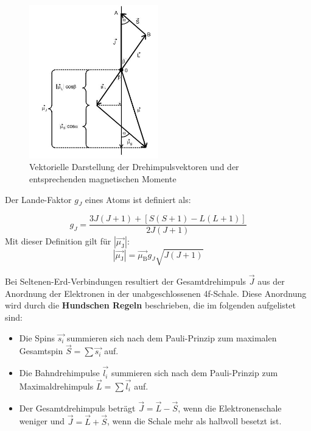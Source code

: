 \begin{figure}[H]
    \centering
    \includegraphics[width=0.5\textwidth]{content/vektoren.JPG}
    \caption{Vektorielle Darstellung der Drehimpulsvektoren und der entsprechenden magnetischen Momente \cite{versuchsanleitung}}
    \label{fig:vektor}
  \end{figure}

Der Lande-Faktor $g_J$ eines Atoms ist definiert als:

\begin{equation}
    g_J = \frac{3J(J+1) + [S(S+1) - L(L+1)]} {2 J(J+1)}
\end{equation}
Mit dieser Definition gilt für $|\vec{\mu_\text{J}}|$:
\begin{equation}
    |\vec{\mu_\text{J}}| = \vec{\mu_\text{B}} g_J \sqrt{J (J+1)} 
\end{equation}

Bei Seltenen-Erd-Verbindungen resultiert der Gesamtdrehimpuls $\vec{J}$ aus der Anordnung der Elektronen in der unabgeschlossenen 4f-Schale. Diese Anordnung wird durch die \textbf{Hundschen Regeln} beschrieben, die im folgenden aufgelistet sind:

\begin{itemize}
    \item Die Spins $\vec{s_i}$ summieren sich nach dem Pauli-Prinzip zum maximalen Gesamtspin
    $\vec{S} = \sum \vec{s_i}$ auf.
    \item Die Bahndrehimpulse $\vec{l_i}$ summieren sich nach dem Pauli-Prinzip zum Maximaldrehimpuls 
    $\vec{L} = \sum \vec{l_i}$ auf.
    \item Der Gesamtdrehimpuls beträgt $\vec{J} = \vec{L} - \vec{S}$, wenn die Elektronenschale weniger und
    $\vec{J} = \vec{L} + \vec{S}$, wenn die Schale mehr als halbvoll besetzt ist.
\end{itemize}

